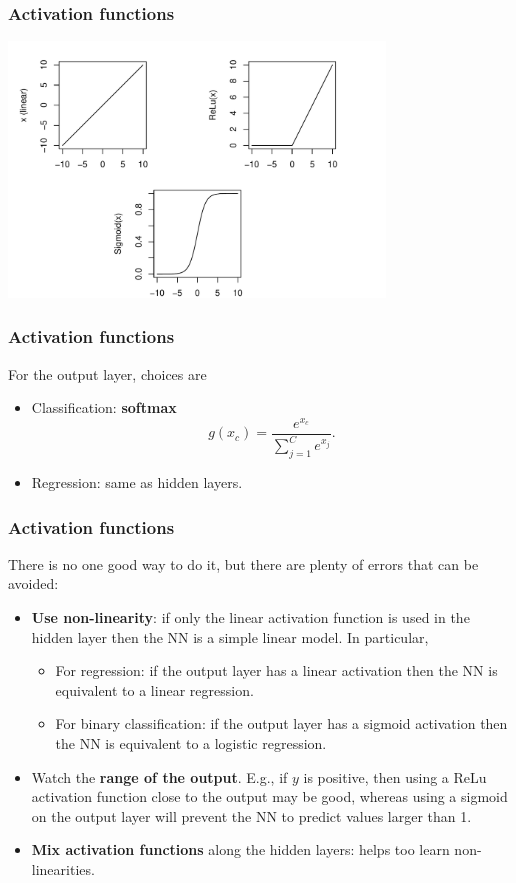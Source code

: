 \begin{frame}
\frametitle{Activation functions}
\begin{center}
\includegraphics[width=10cm]{../../Graphs/Activation_graphs.png}
\end{center}
\end{frame}
\begin{frame}
\frametitle{Activation functions}
For the output layer, choices are
\begin{itemize}
\item Classification: {\bf softmax}
$$
g(x_c) = \frac{e^{x_c}}{\sum_{j=1}^C e^{x_j}}.
$$
\item Regression: same as hidden layers.
\end{itemize}
\end{frame}
\begin{frame}
\frametitle{Activation functions}
There is no one good way to do it, but there are plenty of errors that can be avoided:
\begin{itemize}
\item {\bf Use non-linearity}: if only the linear activation function is used in the hidden layer then the NN is a simple linear model. In particular,
\begin{itemize}
\item For regression: if the output layer has a linear activation then the NN is equivalent to a linear regression.
\item For binary classification: if the output layer has a sigmoid activation then the NN is equivalent to a logistic regression.
\end{itemize}
\item Watch the {\bf range of the output}. E.g., if $y$ is positive, then using a ReLu activation function close to the output may be good, whereas using a sigmoid on the output layer will prevent the NN to predict values larger than 1.
\item {\bf Mix activation functions} along the hidden layers: helps too learn non-linearities.
\end{itemize}
\end{frame}
